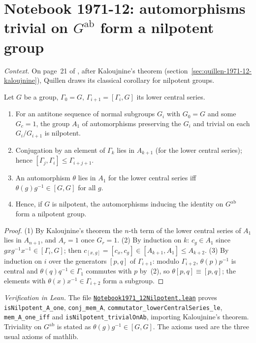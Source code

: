 \section[Notebook 1971-12: Kaloujnine's corollary]{Notebook 1971-12: automorphisms trivial on $G^{\mathrm{ab}}$ form a nilpotent group\protect{}}\label{sec:quillen-1971-12-nilpotent}

\emph{Context.} On page~21 of , after Kaloujnine's theorem (section~\ref{sec:quillen-1971-12-kaloujnine}), Quillen draws its classical corollary for nilpotent groups.

\begin{encadre}
\begin{theoreme}\label{thm:quillen-1971-12-nilpotent}
Let $G$ be a group, $\Gamma_0 = G$, $\Gamma_{i+1} = [\Gamma_i, G]$ its lower central series.
\begin{enumerate}
\item For an antitone sequence of normal subgroups $G_i$ with $G_0 = G$ and some $G_c = 1$, the group $A_1$ of automorphisms preserving the $G_i$ and trivial on each $G_i/G_{i+1}$ is nilpotent.
\item Conjugation by an element of $\Gamma_k$ lies in $A_{k+1}$ (for the lower central series); hence $[\Gamma_j, \Gamma_i] \le \Gamma_{i+j+1}$.
\item An automorphism $\theta$ lies in $A_1$ for the lower central series iff $\theta(g)g^{-1} \in [G, G]$ for all $g$.
\item Hence, if $G$ is nilpotent, the automorphisms inducing the identity on $G^{\mathrm{ab}}$ form a nilpotent group.
\end{enumerate}
\end{theoreme}
\end{encadre}

\begin{proof}
(1) By Kaloujnine's theorem the $n$-th term of the lower central series of $A_1$ lies in $A_{n+1}$, and $A_r = 1$ once $G_r = 1$. (2) By induction on $k$: $c_g \in A_1$ since $gxg^{-1}x^{-1} \in [\Gamma_i, G]$; then $c_{[x,g]} = [c_x, c_g] \in [A_{k+1}, A_1] \le A_{k+2}$. (3) By induction on $i$ over the generators $[p, q]$ of $\Gamma_{i+1}$: modulo $\Gamma_{i+2}$, $\theta(p)p^{-1}$ is central and $\theta(q)q^{-1} \in \Gamma_1$ commutes with $p$ by~(2), so $\theta[p, q] \equiv [p, q]$; the elements with $\theta(x)x^{-1} \in \Gamma_{i+2}$ form a subgroup.
\end{proof}

\emph{Verification in Lean.} The file \href{\leanblobmain/Notebook1971_12Nilpotent.lean}{\texttt{Notebook1971\_12Nilpotent.\allowbreak{}lean}} proves \texttt{isNilpotent\_A\_one}, \texttt{conj\_mem\_A}, \texttt{commutator\_lowerCentralSeries\_le}, \texttt{mem\_A\_one\_iff} and \texttt{isNilpotent\_trivialOnAb}, importing Kaloujnine's theorem. Triviality on $G^{\mathrm{ab}}$ is stated as $\theta(g)g^{-1} \in [G, G]$. The axioms used are the three usual axioms of mathlib.

